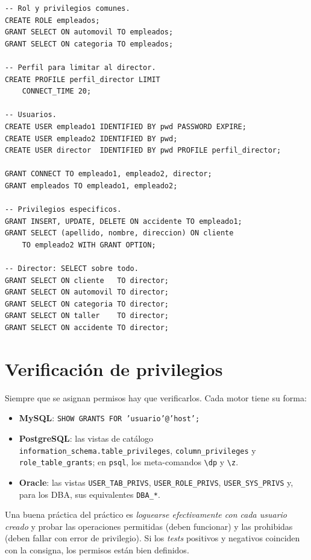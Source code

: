 \documentclass[11pt,a4paper]{article}
\begin{document}
\begin{lstlisting}
-- Rol y privilegios comunes.
CREATE ROLE empleados;
GRANT SELECT ON automovil TO empleados;
GRANT SELECT ON categoria TO empleados;

-- Perfil para limitar al director.
CREATE PROFILE perfil_director LIMIT
    CONNECT_TIME 20;

-- Usuarios.
CREATE USER empleado1 IDENTIFIED BY pwd PASSWORD EXPIRE;
CREATE USER empleado2 IDENTIFIED BY pwd;
CREATE USER director  IDENTIFIED BY pwd PROFILE perfil_director;

GRANT CONNECT TO empleado1, empleado2, director;
GRANT empleados TO empleado1, empleado2;

-- Privilegios especificos.
GRANT INSERT, UPDATE, DELETE ON accidente TO empleado1;
GRANT SELECT (apellido, nombre, direccion) ON cliente
    TO empleado2 WITH GRANT OPTION;

-- Director: SELECT sobre todo.
GRANT SELECT ON cliente   TO director;
GRANT SELECT ON automovil TO director;
GRANT SELECT ON categoria TO director;
GRANT SELECT ON taller    TO director;
GRANT SELECT ON accidente TO director;
\end{lstlisting}

\section{Verificación de privilegios}

Siempre que se asignan permisos hay que verificarlos. Cada motor tiene
su forma:

\begin{itemize}
    \item \textbf{MySQL}: \texttt{SHOW GRANTS FOR 'usuario'@'host';}
    \item \textbf{PostgreSQL}: las vistas de catálogo
    \texttt{information\_schema.table\_privileges},
    \texttt{column\_privileges} y \texttt{role\_table\_grants}; en
    \texttt{psql}, los meta-comandos \texttt{\textbackslash dp} y
    \texttt{\textbackslash z}.
    \item \textbf{Oracle}: las vistas \texttt{USER\_TAB\_PRIVS},
    \texttt{USER\_ROLE\_PRIVS}, \texttt{USER\_SYS\_PRIVS} y, para los
    DBA, sus equivalentes \texttt{DBA\_*}.
\end{itemize}

Una buena práctica del práctico es \emph{loguearse efectivamente con
cada usuario creado} y probar las operaciones permitidas (deben
funcionar) y las prohibidas (deben fallar con error de privilegio).
Si los \emph{tests} positivos y negativos coinciden con la consigna,
los permisos están bien definidos.
\end{document}
